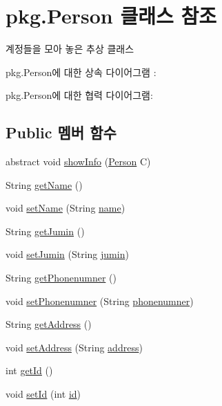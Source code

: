 \hypertarget{classpkg_1_1_person}{}\section{pkg.\+Person 클래스 참조}
\label{classpkg_1_1_person}


계정들을 모아 놓은 추상 클래스  




pkg.\+Person에 대한 상속 다이어그램 \+: 


pkg.\+Person에 대한 협력 다이어그램\+:
\subsection*{Public 멤버 함수}
\begin{DoxyCompactItemize}
\item 
abstract void \hyperlink{classpkg_1_1_person_a567e21bfe61d1d4ad8e5c73256f00e86}{show\+Info} (\hyperlink{classpkg_1_1_person}{Person} C)
\item 
String \hyperlink{classpkg_1_1_person_ab524891b4990ebc4792ee2b8ad7748df}{get\+Name} ()
\item 
void \hyperlink{classpkg_1_1_person_ae7d5ce841c73e816d0f6751c8a7c0b22}{set\+Name} (String \hyperlink{classpkg_1_1_person_a37fd1fe3cf039df98ffca54df6002bb6}{name})
\item 
String \hyperlink{classpkg_1_1_person_aae5ac75c9dd518c4f88b2bcdb51c11d1}{get\+Jumin} ()
\item 
void \hyperlink{classpkg_1_1_person_ab1124c006fbc8ce0e0b9daab2c8422bd}{set\+Jumin} (String \hyperlink{classpkg_1_1_person_aef72766ac67a0af8074b513d00c523f8}{jumin})
\item 
String \hyperlink{classpkg_1_1_person_ad385ada4f1bfde67bbc9fbe8681277f0}{get\+Phonenumner} ()
\item 
void \hyperlink{classpkg_1_1_person_ab2ab58ad8afdb5edaa73ee57b63b657d}{set\+Phonenumner} (String \hyperlink{classpkg_1_1_person_aa7a67349f91a08a8cc45067354653c1d}{phonenumner})
\item 
String \hyperlink{classpkg_1_1_person_a590b6e7e8f71c26f427bdbbd4594ffd1}{get\+Address} ()
\item 
void \hyperlink{classpkg_1_1_person_aa74c6a07ade9f2fb7d7fa02be6fcf391}{set\+Address} (String \hyperlink{classpkg_1_1_person_a692aadebf7edf808fbcbacbcaed07ef3}{address})
\item 
int \hyperlink{classpkg_1_1_person_a2da9408fa69eac5cd12efdbdf93b82ed}{get\+Id} ()
\item 
void \hyperlink{classpkg_1_1_person_ac3efab3a29aa4fabc4163f6d3c633906}{set\+Id} (int \hyperlink{classpkg_1_1_person_acd3bca96258af32adc1eca89b74222a6}{id})
\end{DoxyCompactItemize}
